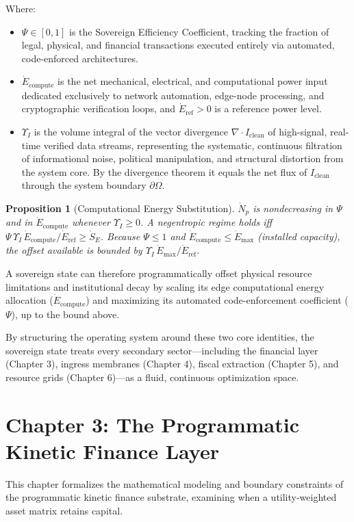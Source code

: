 \documentclass[11pt,a4paper]{article}
\theoremstyle{definition}
\theoremstyle{plain}
\newtheorem{proposition}{Proposition}
\theoremstyle{remark}
\newcommand{\Edot}{\dot E_{\mathrm{compute}}}
\newcommand{\Eref}{\dot E_{\mathrm{ref}}}
\begin{document}
Where:
\begin{itemize}
\item $\Psi \in [0,1]$ is the Sovereign Efficiency Coefficient, tracking the fraction of legal, physical, and financial transactions executed entirely via automated, code-enforced architectures.
\item $\Edot$ is the net mechanical, electrical, and computational power input dedicated exclusively to network automation, edge-node processing, and cryptographic verification loops, and $\Eref > 0$ is a reference power level.
\item $\Upsilon_I$ is the volume integral of the vector divergence $\nabla\!\cdot I_{\mathrm{clean}}$ of high-signal, real-time verified data streams, representing the systematic, continuous filtration of informational noise, political manipulation, and structural distortion from the system core. By the divergence theorem it equals the net flux of $I_{\mathrm{clean}}$ through the system boundary $\partial\Omega$.
\end{itemize}

\begin{proposition}[Computational Energy Substitution]\label{prop:axiom2}
$\dot N_p$ is nondecreasing in $\Psi$ and in $\Edot$ whenever $\Upsilon_I \ge 0$. A negentropic regime holds iff $\Psi\,\Upsilon_I\,\Edot/\Eref \ge \dot S_E$. Because $\Psi \le 1$ and $\Edot \le \dot E_{\max}$ (installed capacity), the offset available is bounded by $\Upsilon_I\,\dot E_{\max}/\Eref$.
\end{proposition}

A sovereign state can therefore programmatically offset physical resource limitations and institutional decay by scaling its edge computational energy allocation ($\Edot$) and maximizing its automated code-enforcement coefficient ($\Psi$), up to the bound above.

By structuring the operating system around these two core identities, the sovereign state treats every secondary sector---including the financial layer (Chapter 3), ingress membranes (Chapter 4), fiscal extraction (Chapter 5), and resource grids (Chapter 6)---as a fluid, continuous optimization space.

\clearpage
\clearpage
\section*{Chapter 3: The Programmatic Kinetic Finance Layer}
This chapter formalizes the mathematical modeling and boundary constraints of the programmatic kinetic finance substrate, examining when a utility-weighted asset matrix retains capital.
\end{document}
